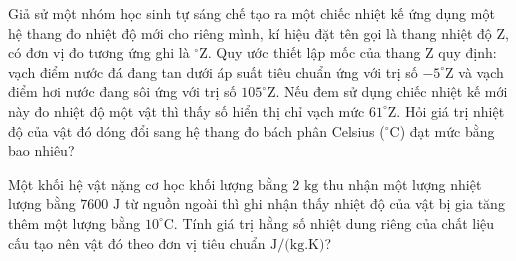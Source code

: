 \begin{ex}	Giả sử một nhóm học sinh tự sáng chế tạo ra một chiếc nhiệt kế ứng dụng một hệ thang đo nhiệt độ mới cho riêng mình, kí hiệu đặt tên gọi là thang nhiệt độ Z, có đơn vị đo tương ứng ghi là $^\circ\text{Z}$. Quy ước thiết lập mốc của thang Z quy định: vạch điểm nước đá đang tan dưới áp suất tiêu chuẩn ứng với trị số $-5^\circ\text{Z}$ và vạch điểm hơi nước đang sôi ứng với trị số $105^\circ\text{Z}$. Nếu đem sử dụng chiếc nhiệt kế mới này đo nhiệt độ một vật thì thấy số hiển thị chỉ vạch mức $61^\circ\text{Z}$. Hỏi giá trị nhiệt độ của vật đó dóng đổi sang hệ thang đo bách phân Celsius ($^\circ\text{C}$) đạt mức bằng bao nhiêu?

	\par{}
\end{ex}

\begin{ex}	Một khối hệ vật nặng cơ học khối lượng bằng $2\text{ kg}$ thu nhận một lượng nhiệt lượng bằng $7600\text{ J}$ từ nguồn ngoài thì ghi nhận thấy nhiệt độ của vật bị gia tăng thêm một lượng bằng $10^\circ\text{C}$. Tính giá trị hằng số nhiệt dung riêng của chất liệu cấu tạo nên vật đó theo đơn vị tiêu chuẩn $\text{J/(kg.K)}$?

	\par{}
\end{ex}

